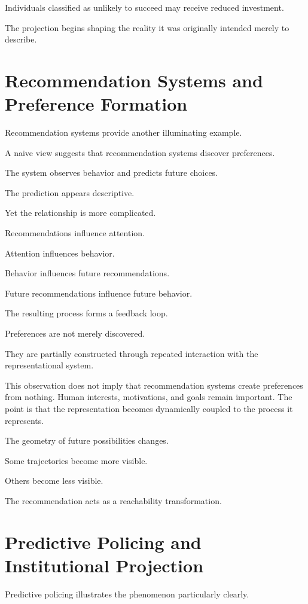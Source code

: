 \documentclass[11pt,oneside,openany]{book}
\begin{document}
Individuals classified as unlikely to succeed may receive reduced investment.

The projection begins shaping the reality it was originally intended merely to describe.

\section{Recommendation Systems and Preference Formation}

Recommendation systems provide another illuminating example.

A naive view suggests that recommendation systems discover preferences.

The system observes behavior and predicts future choices.

The prediction appears descriptive.

Yet the relationship is more complicated.

Recommendations influence attention.

Attention influences behavior.

Behavior influences future recommendations.

Future recommendations influence future behavior.

The resulting process forms a feedback loop.

Preferences are not merely discovered.

They are partially constructed through repeated interaction with the representational system.

This observation does not imply that recommendation systems create preferences from nothing. Human interests, motivations, and goals remain important. The point is that the representation becomes dynamically coupled to the process it represents.

The geometry of future possibilities changes.

Some trajectories become more visible.

Others become less visible.

The recommendation acts as a reachability transformation.

\section{Predictive Policing and Institutional Projection}

Predictive policing illustrates the phenomenon particularly clearly.
\end{document}
